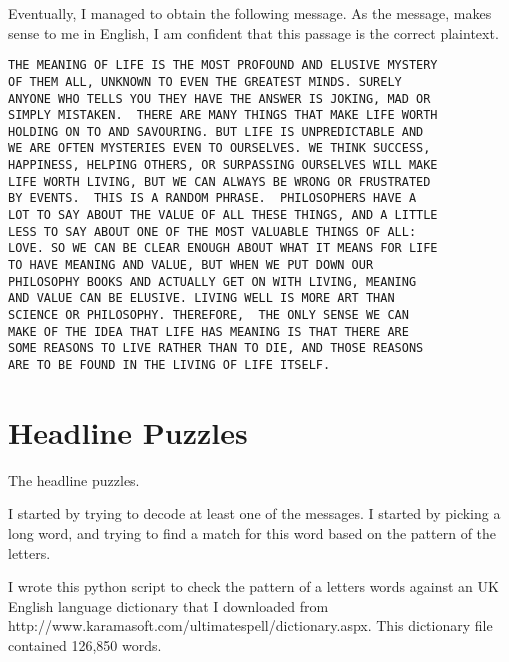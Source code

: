 \documentclass[12pt,a4paper,twoside]{article}
\begin{document}
Eventually, I managed to obtain the following message. As the message, makes
sense to me in English, I am confident that this passage is the correct
plaintext. 

\begin{lstlisting}
THE MEANING OF LIFE IS THE MOST PROFOUND AND ELUSIVE MYSTERY
OF THEM ALL, UNKNOWN TO EVEN THE GREATEST MINDS. SURELY
ANYONE WHO TELLS YOU THEY HAVE THE ANSWER IS JOKING, MAD OR
SIMPLY MISTAKEN.  THERE ARE MANY THINGS THAT MAKE LIFE WORTH
HOLDING ON TO AND SAVOURING. BUT LIFE IS UNPREDICTABLE AND
WE ARE OFTEN MYSTERIES EVEN TO OURSELVES. WE THINK SUCCESS,
HAPPINESS, HELPING OTHERS, OR SURPASSING OURSELVES WILL MAKE
LIFE WORTH LIVING, BUT WE CAN ALWAYS BE WRONG OR FRUSTRATED
BY EVENTS.  THIS IS A RANDOM PHRASE.  PHILOSOPHERS HAVE A
LOT TO SAY ABOUT THE VALUE OF ALL THESE THINGS, AND A LITTLE
LESS TO SAY ABOUT ONE OF THE MOST VALUABLE THINGS OF ALL:
LOVE. SO WE CAN BE CLEAR ENOUGH ABOUT WHAT IT MEANS FOR LIFE
TO HAVE MEANING AND VALUE, BUT WHEN WE PUT DOWN OUR
PHILOSOPHY BOOKS AND ACTUALLY GET ON WITH LIVING, MEANING
AND VALUE CAN BE ELUSIVE. LIVING WELL IS MORE ART THAN
SCIENCE OR PHILOSOPHY. THEREFORE,  THE ONLY SENSE WE CAN
MAKE OF THE IDEA THAT LIFE HAS MEANING IS THAT THERE ARE
SOME REASONS TO LIVE RATHER THAN TO DIE, AND THOSE REASONS
ARE TO BE FOUND IN THE LIVING OF LIFE ITSELF.
\end{lstlisting}


\section{Headline Puzzles}
The headline puzzles.

I started by trying to decode at least one of the messages. I started by
picking a long word, and trying to find a match for this word based on the
pattern of the letters. 

I wrote this python script to check the pattern of a letters words against an
UK English language dictionary that I downloaded from
http://www.karamasoft.com/ultimatespell/dictionary.aspx. This dictionary file
contained 126,850 words. 
\end{document}
